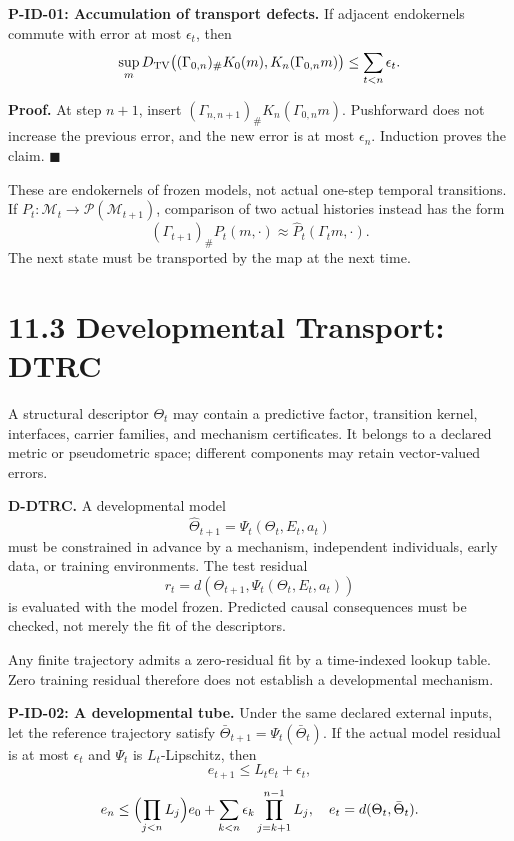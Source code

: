\documentclass[
  english,
  11pt,
  oneside]{book}
\begin{document}
\hypertarget{p-id-01}{}\label{p-id-01}

\textbf{P-ID-01: Accumulation of transport defects.} If adjacent endokernels commute with error at most \(\epsilon_t\), then \[\sup_mD_{\rm TV}\bigl((\Gamma_{0,n})_\#K_0(m),
K_n(\Gamma_{0,n}m)\bigr)\le\sum_{t<n}\epsilon_t.\]

\textbf{Proof.} At step \(n+1\), insert \((\Gamma_{n,n+1})_\#K_n(\Gamma_{0,n}m)\). Pushforward does not increase the previous error, and the new error is at most \(\epsilon_n\). Induction proves the claim. \(\blacksquare\)

These are endokernels of frozen models, not actual one-step temporal transitions. If \(P_t:\mathcal M_t\to\mathcal P(\mathcal M_{t+1})\), comparison of two actual histories instead has the form \[(\Gamma_{t+1})_\#P_t(m,\cdot)
\approx\widehat P_t(\Gamma_tm,\cdot).\] The next state must be transported by the map at the next time.

\section{11.3 Developmental Transport: DTRC}\label{developmental-transport-dtrc}

A structural descriptor \(\Theta_t\) may contain a predictive factor, transition kernel, interfaces, carrier families, and mechanism certificates. It belongs to a declared metric or pseudometric space; different components may retain vector-valued errors.

\textbf{D-DTRC.} A developmental model \[\widehat\Theta_{t+1}=\Psi_t(\Theta_t,E_t,a_t)\] must be constrained in advance by a mechanism, independent individuals, early data, or training environments. The test residual \[r_t=d(\Theta_{t+1},\Psi_t(\Theta_t,E_t,a_t))\] is evaluated with the model frozen. Predicted causal consequences must be checked, not merely the fit of the descriptors.

Any finite trajectory admits a zero-residual fit by a time-indexed lookup table. Zero training residual therefore does not establish a developmental mechanism.

\hypertarget{p-id-02}{}\label{p-id-02}

\textbf{P-ID-02: A developmental tube.} Under the same declared external inputs, let the reference trajectory satisfy \(\bar\Theta_{t+1}=\Psi_t(\bar\Theta_t)\). If the actual model residual is at most \(\epsilon_t\) and \(\Psi_t\) is \(L_t\)-Lipschitz, then \[e_{t+1}\le L_te_t+\epsilon_t,\] \[e_n\le\Bigl(\prod_{j<n}L_j\Bigr)e_0+
\sum_{k<n}\epsilon_k\prod_{j=k+1}^{n-1}L_j,
\quad e_t=d(\Theta_t,\bar\Theta_t).\]
\end{document}
